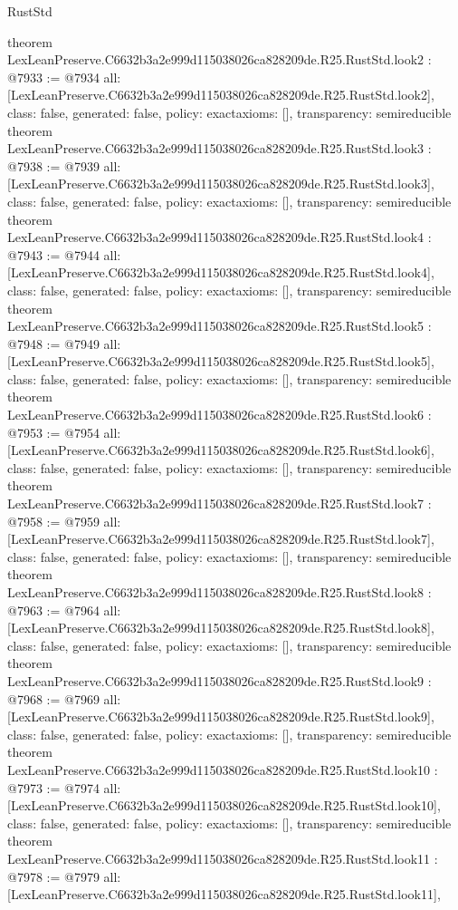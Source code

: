 \begin{lexlean}{RustStd}
\begin{coremodule}
{}
theorem LexLeanPreserve.C6632b3a2e999d115038026ca828209de.R25.RustStd.look2 : @7933 := @7934 {
  all: [LexLeanPreserve.C6632b3a2e999d115038026ca828209de.R25.RustStd.look2],
  class: false,
  generated: false,
  policy: exact{axioms: []},
  transparency: semireducible
}
theorem LexLeanPreserve.C6632b3a2e999d115038026ca828209de.R25.RustStd.look3 : @7938 := @7939 {
  all: [LexLeanPreserve.C6632b3a2e999d115038026ca828209de.R25.RustStd.look3],
  class: false,
  generated: false,
  policy: exact{axioms: []},
  transparency: semireducible
}
theorem LexLeanPreserve.C6632b3a2e999d115038026ca828209de.R25.RustStd.look4 : @7943 := @7944 {
  all: [LexLeanPreserve.C6632b3a2e999d115038026ca828209de.R25.RustStd.look4],
  class: false,
  generated: false,
  policy: exact{axioms: []},
  transparency: semireducible
}
theorem LexLeanPreserve.C6632b3a2e999d115038026ca828209de.R25.RustStd.look5 : @7948 := @7949 {
  all: [LexLeanPreserve.C6632b3a2e999d115038026ca828209de.R25.RustStd.look5],
  class: false,
  generated: false,
  policy: exact{axioms: []},
  transparency: semireducible
}
theorem LexLeanPreserve.C6632b3a2e999d115038026ca828209de.R25.RustStd.look6 : @7953 := @7954 {
  all: [LexLeanPreserve.C6632b3a2e999d115038026ca828209de.R25.RustStd.look6],
  class: false,
  generated: false,
  policy: exact{axioms: []},
  transparency: semireducible
}
theorem LexLeanPreserve.C6632b3a2e999d115038026ca828209de.R25.RustStd.look7 : @7958 := @7959 {
  all: [LexLeanPreserve.C6632b3a2e999d115038026ca828209de.R25.RustStd.look7],
  class: false,
  generated: false,
  policy: exact{axioms: []},
  transparency: semireducible
}
theorem LexLeanPreserve.C6632b3a2e999d115038026ca828209de.R25.RustStd.look8 : @7963 := @7964 {
  all: [LexLeanPreserve.C6632b3a2e999d115038026ca828209de.R25.RustStd.look8],
  class: false,
  generated: false,
  policy: exact{axioms: []},
  transparency: semireducible
}
theorem LexLeanPreserve.C6632b3a2e999d115038026ca828209de.R25.RustStd.look9 : @7968 := @7969 {
  all: [LexLeanPreserve.C6632b3a2e999d115038026ca828209de.R25.RustStd.look9],
  class: false,
  generated: false,
  policy: exact{axioms: []},
  transparency: semireducible
}
theorem LexLeanPreserve.C6632b3a2e999d115038026ca828209de.R25.RustStd.look10 : @7973 := @7974 {
  all: [LexLeanPreserve.C6632b3a2e999d115038026ca828209de.R25.RustStd.look10],
  class: false,
  generated: false,
  policy: exact{axioms: []},
  transparency: semireducible
}
theorem LexLeanPreserve.C6632b3a2e999d115038026ca828209de.R25.RustStd.look11 : @7978 := @7979 {
  all: [LexLeanPreserve.C6632b3a2e999d115038026ca828209de.R25.RustStd.look11],
}
\end{coremodule}
\end{lexlean}
